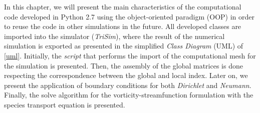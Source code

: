 In this chapter, we will present the main characteristics 
of the computational code developed in Python 2.7 \cite{python} 
using the object-oriented paradigm (OOP) in order to reuse the code 
in other simulations in the future. All developed classes are imported 
into the simulator (\textit{TriSim}), where the result of the 
numerical simulation is exported as presented in the 
simplified \textit{Class Diagram} (UML) of \ref{uml}. 
Initially, the \textit{script} that performs the import 
of the computational mesh for the simulation is presented. 
Then, the assembly of the global matrices is done 
respecting the correspondence between the global and local index. 
Later on, we present the application of boundary conditions for 
both \textit{Dirichlet} and \textit{Neumann}. 
Finally, the solve algorithm for the vorticity-streamfunction 
formulation with the species transport equation is presented.

